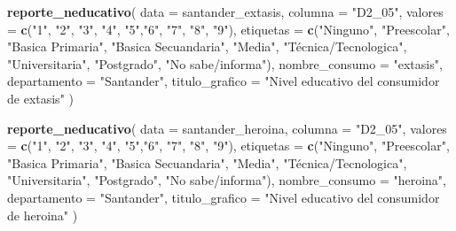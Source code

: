\documentclass[
]{article}
\newenvironment{Shaded}{\begin{snugshade}}{\end{snugshade}}
\newcommand{\AttributeTok}[1]{\textcolor[rgb]{0.13,0.29,0.53}{#1}}
\newcommand{\FunctionTok}[1]{\textcolor[rgb]{0.13,0.29,0.53}{\textbf{#1}}}
\newcommand{\NormalTok}[1]{#1}
\newcommand{\StringTok}[1]{\textcolor[rgb]{0.31,0.60,0.02}{#1}}
\begin{document}
\begin{Shaded}
\begin{Highlighting}[]
\FunctionTok{reporte\_neducativo}\NormalTok{(}
  \AttributeTok{data =}\NormalTok{ santander\_extasis,}
  \AttributeTok{columna =} \StringTok{"D2\_05"}\NormalTok{,}
  \AttributeTok{valores =} \FunctionTok{c}\NormalTok{(}\StringTok{"1"}\NormalTok{, }\StringTok{"2"}\NormalTok{, }\StringTok{"3"}\NormalTok{, }\StringTok{"4"}\NormalTok{, }\StringTok{"5"}\NormalTok{,}\StringTok{"6"}\NormalTok{, }\StringTok{"7"}\NormalTok{, }\StringTok{"8"}\NormalTok{, }\StringTok{"9"}\NormalTok{),}
  \AttributeTok{etiquetas =} \FunctionTok{c}\NormalTok{(}\StringTok{"Ninguno"}\NormalTok{, }\StringTok{"Preescolar"}\NormalTok{, }\StringTok{"Basica Primaria"}\NormalTok{, }\StringTok{"Basica Secuandaria"}\NormalTok{, }\StringTok{"Media"}\NormalTok{, }\StringTok{"Técnica/Tecnologica"}\NormalTok{, }\StringTok{"Universitaria"}\NormalTok{, }\StringTok{"Postgrado"}\NormalTok{, }\StringTok{"No sabe/informa"}\NormalTok{),}
  \AttributeTok{nombre\_consumo =} \StringTok{"extasis"}\NormalTok{,}
  \AttributeTok{departamento =} \StringTok{"Santander"}\NormalTok{,}
  \AttributeTok{titulo\_grafico =} \StringTok{"Nivel educativo del consumidor de extasis"}
\NormalTok{)}

\FunctionTok{reporte\_neducativo}\NormalTok{(}
  \AttributeTok{data =}\NormalTok{ santander\_heroina,}
  \AttributeTok{columna =} \StringTok{"D2\_05"}\NormalTok{,}
  \AttributeTok{valores =} \FunctionTok{c}\NormalTok{(}\StringTok{"1"}\NormalTok{, }\StringTok{"2"}\NormalTok{, }\StringTok{"3"}\NormalTok{, }\StringTok{"4"}\NormalTok{, }\StringTok{"5"}\NormalTok{,}\StringTok{"6"}\NormalTok{, }\StringTok{"7"}\NormalTok{, }\StringTok{"8"}\NormalTok{, }\StringTok{"9"}\NormalTok{),}
  \AttributeTok{etiquetas =} \FunctionTok{c}\NormalTok{(}\StringTok{"Ninguno"}\NormalTok{, }\StringTok{"Preescolar"}\NormalTok{, }\StringTok{"Basica Primaria"}\NormalTok{, }\StringTok{"Basica Secuandaria"}\NormalTok{, }\StringTok{"Media"}\NormalTok{, }\StringTok{"Técnica/Tecnologica"}\NormalTok{, }\StringTok{"Universitaria"}\NormalTok{, }\StringTok{"Postgrado"}\NormalTok{, }\StringTok{"No sabe/informa"}\NormalTok{),}
  \AttributeTok{nombre\_consumo =} \StringTok{"heroina"}\NormalTok{,}
  \AttributeTok{departamento =} \StringTok{"Santander"}\NormalTok{,}
  \AttributeTok{titulo\_grafico =} \StringTok{"Nivel educativo del consumidor de heroina"}
\NormalTok{)}


\end{Highlighting}
\end{Shaded}
\end{document}
